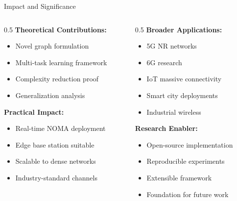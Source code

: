 \documentclass[aspectratio=169]{beamer}
\begin{document}
\begin{frame}{Impact and Significance}
    \begin{columns}
        \begin{column}{0.5\textwidth}
            \textbf{Theoretical Contributions:}
            \begin{itemize}
                \item Novel graph formulation
                \item Multi-task learning framework
                \item Complexity reduction proof
                \item Generalization analysis
            \end{itemize}
            
            \vspace{0.3cm}
            
            \textbf{Practical Impact:}
            \begin{itemize}
                \item Real-time NOMA deployment
                \item Edge base station suitable
                \item Scalable to dense networks
                \item Industry-standard channels
            \end{itemize}
        \end{column}
        \begin{column}{0.5\textwidth}
            \textbf{Broader Applications:}
            \begin{itemize}
                \item 5G NR networks
                \item 6G research
                \item IoT massive connectivity
                \item Smart city deployments
                \item Industrial wireless
            \end{itemize}
            
            \vspace{0.3cm}
            
            \textbf{Research Enabler:}
            \begin{itemize}
                \item Open-source implementation
                \item Reproducible experiments
                \item Extensible framework
                \item Foundation for future work
            \end{itemize}
        \end{column}
    \end{columns}
    

\end{frame}
\end{document}
